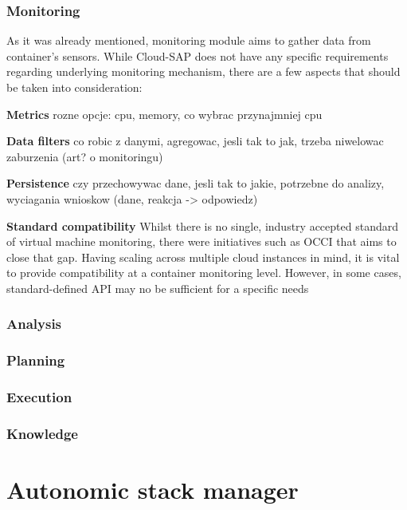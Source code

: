 \subsubsection{Monitoring}
As it was already mentioned, monitoring module aims to gather data from container's sensors. While Cloud-SAP does not have any specific requirements regarding underlying monitoring mechanism, there are a few aspects that should be taken into consideration:
\begin{asparaenum}
  \item[\textbf{Metrics}] rozne opcje: cpu, memory, co wybrac przynajmniej cpu

  \item[\textbf{Data filters}] co robic z danymi, agregowac, jesli tak to jak, trzeba niwelowac zaburzenia (art? o monitoringu)

  \item[\textbf{Persistence}] czy przechowywac dane, jesli tak to jakie, potrzebne do analizy, wyciagania wnioskow (dane, reakcja -> odpowiedz)

  \item[\textbf{Standard compatibility}] Whilst there is no single, industry accepted standard of virtual machine monitoring, there were initiatives such as OCCI \cite{OCCI} that aims to close that gap. Having scaling across multiple cloud instances in mind, it is vital to provide compatibility at a container monitoring level. However, in some cases, standard-defined API may no be sufficient for a specific needs  
\end{asparaenum}


\subsubsection{Analysis}

\subsubsection{Planning}

\subsubsection{Execution}

\subsubsection{Knowledge}

\section{Autonomic stack manager}
